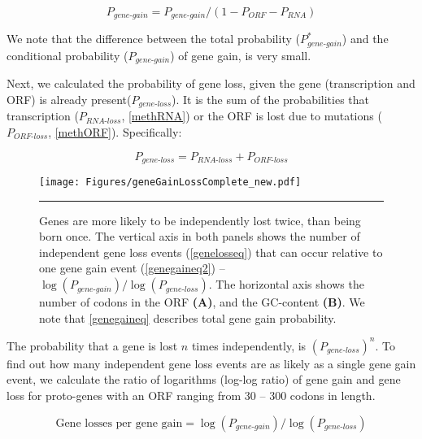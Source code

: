 \documentclass[12pt,a4paper]{article}
\begin{document}
\begin{equation}
P_\textit{gene-gain} = P_\textit{gene-gain}/(1-P_\textit{ORF} - P_\textit{RNA})
\label{genegaineq2}
\end{equation}

We note that the difference between the total probability ($P_\textit{gene-gain}^*$) and the conditional probability ($P_\textit{gene-gain}$) of gene gain, is very small.

Next, we calculated the probability of gene loss, given the gene (transcription and ORF) is already present($P_\textit{gene-loss}$). It is the sum of the probabilities that transcription ($P_\textit{RNA-loss}$, \autoref{methRNA}) or the ORF is lost due to mutations ($P_\textit{ORF-loss}$, \autoref{methORF}). Specifically:

\begin{equation}
P_\textit{gene-loss} = P_\textit{RNA-loss} + P_\textit{ORF-loss}
\label{genelosseq}
\end{equation}

\begin{figure}[!t]
\centering
\texttt{[image: Figures/geneGainLossComplete\_new.pdf]}
\caption{Genes are more likely to be independently lost twice, than being born once. The vertical axis in both panels shows the number of independent gene loss events (\autoref{genelosseq}) that can occur relative to one gene gain event (\autoref{genegaineq2}) -- $\log(P_\textit{gene-gain})/\log(P_\textit{gene-loss})$. The horizontal axis shows the number of codons in the ORF \textbf{(A)}, and the GC-content \textbf{(B)}. We note that \autoref{genegaineq} describes total gene gain probability.}
\label{gainlossprob}
\vspace{1ex}
\hrule
\end{figure}

The probability that a gene is lost $n$ times independently, is $(P_\textit{gene-loss})^{n}$. To find out how many independent gene loss events are as likely as a single gene gain event, we calculate the ratio of logarithms (log-log ratio) of gene gain and gene loss for proto-genes with an ORF ranging from 30 -- 300 codons in length.

$$ \text{Gene losses per gene gain} = \log(P_\textit{gene-gain})/\log(P_\textit{gene-loss})$$
\end{document}
